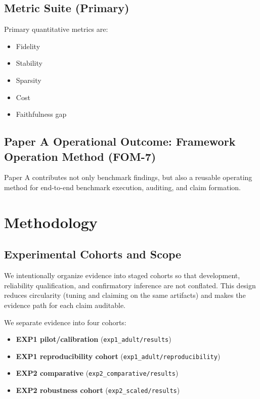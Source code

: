\documentclass[twoside,11pt]{article}
\begin{document}
\subsection{Metric Suite (Primary)}
Primary quantitative metrics are:
\begin{itemize}[leftmargin=*]
    \item Fidelity
    \item Stability
    \item Sparsity
    \item Cost
    \item Faithfulness gap
\end{itemize}

\subsection{Paper A Operational Outcome: Framework Operation Method (FOM-7)}
Paper A contributes not only benchmark findings, but also a reusable operating method for end-to-end benchmark execution, auditing, and claim formation.

\section{Methodology}

\subsection{Experimental Cohorts and Scope}
We intentionally organize evidence into staged cohorts so that development, reliability qualification, and confirmatory inference are not conflated. This design reduces circularity (tuning and claiming on the same artifacts) and makes the evidence path for each claim auditable.

We separate evidence into four cohorts:
\begin{itemize}[leftmargin=*]
    \item \textbf{EXP1 pilot/calibration} (\texttt{exp1\_adult/results})
    \item \textbf{EXP1 reproducibility cohort} (\texttt{exp1\_adult/reproducibility})
    \item \textbf{EXP2 comparative} (\texttt{exp2\_comparative/results})
    \item \textbf{EXP2 robustness cohort} (\texttt{exp2\_scaled/results})
\end{itemize}
\end{document}
